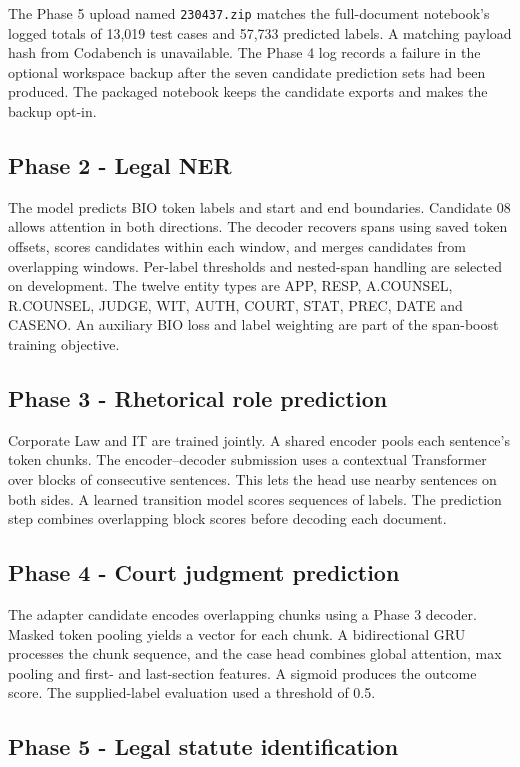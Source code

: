 \documentclass[11pt, oneside]{article}
\begin{document}
The Phase 5 upload named \texttt{230437.zip} matches the full-document notebook's logged totals of 13,019 test cases and 57,733 predicted labels. A matching payload hash from Codabench is unavailable. The Phase 4 log records a failure in the optional workspace backup after the seven candidate prediction sets had been produced. The packaged notebook keeps the candidate exports and makes the backup opt-in.


\subsection{Phase 2 - Legal NER}

The model predicts BIO token labels and start and end boundaries. Candidate 08 allows attention in both directions. The decoder recovers spans using saved token offsets, scores candidates within each window, and merges candidates from overlapping windows. Per-label thresholds and nested-span handling are selected on development. The twelve entity types are APP, RESP, A.COUNSEL, R.COUNSEL, JUDGE, WIT, AUTH, COURT, STAT, PREC, DATE and CASENO. An auxiliary BIO loss and label weighting are part of the span-boost training objective.

\subsection{Phase 3 - Rhetorical role prediction}

Corporate Law and IT are trained jointly. A shared encoder pools each sentence's token chunks. The encoder--decoder submission uses a contextual Transformer over blocks of consecutive sentences. This lets the head use nearby sentences on both sides. A learned transition model scores sequences of labels. The prediction step combines overlapping block scores before decoding each document.

\subsection{Phase 4 - Court judgment prediction}

The adapter candidate encodes overlapping chunks using a Phase 3 decoder. Masked token pooling yields a vector for each chunk. A bidirectional GRU processes the chunk sequence, and the case head combines global attention, max pooling and first- and last-section features. A sigmoid produces the outcome score. The supplied-label evaluation used a threshold of 0.5.

\subsection{Phase 5 - Legal statute identification}
\end{document}
